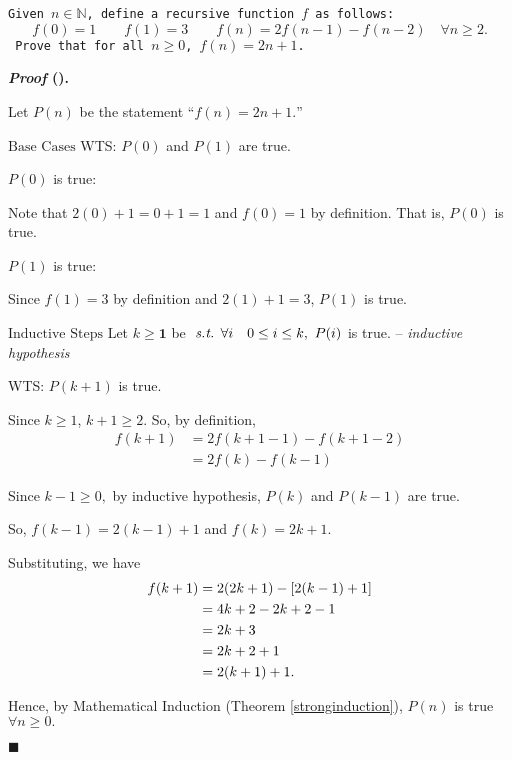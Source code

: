 \documentclass[12pt,a4paper]{article}
\newcounter{nprf}[subsection]
\newenvironment*{prf}{\par\indent\textbf{\textit{Proof} (\stepcounter{nprf}\thenprf). }\par }{\par\hfill $\blacksquare$\par}
\def\N{{\mathbb{N}}}
\def\st{\emph{ s.t. }}
\begin{document}
\begin{framed}
\noindent\texttt{Given $n\in\N$, define a recursive function $f$ as follows: \[f(0)=1\qquad f(1)=3\qquad f(n)=2f(n-1)-f(n-2)\quad\forall n\geq2.\] Prove that for all $n\geq0$, $f(n)=2n+1$.}
\begin{prf}
	Let $P(n)$ be the statement ``$f(n)=2n+1.$''\par$\boxed{\text{Base Cases}}$ 	WTS: $P(0)$ and $P(1)$ are true.\par\hspace{5mm} $P(0)$ is true: \big[WTS: $f(0)=2(0)+1$\big]\par\hspace{10mm}Note that $2(0)+1=0+1=1$ and $f(0)=1$ by definition. That is, $P(0)$ is true.\par\hspace{5mm} $P(1)$ is true: \big[WTS:$f(1)=2(1)+1$\big]\par\hspace{10mm} Since $f(1)=3$ by definition and $2(1)+1=3$, $P(1)$ is true. \par$\boxed{\text{Inductive Steps}}$ Let $k\geq\mathbf{1}$ be $\st\forall i\quad 0\leq i\leq k,\ P(i)$ is true. -- \textit{inductive hypothesis} \par\hspace{5mm} WTS: $P(k+1)$ is true. \par\hspace{5mm} Since $k\geq1$, $k+1\geq2$. So, by definition, \[\begin{aligned}f(k+1)&=2f(k+1-1)-f(k+1-2)\\&=2f(k)-f(k-1)\end{aligned}\]\par\hspace{5mm} Since $k-1\geq0,$ by inductive hypothesis, $P(k)$ and $P(k-1)$ are true.\par\hspace{5mm} So, $f(k-1)=2(k-1)+1$ and $f(k)=2k+1$.\par\hspace{5mm} Substituting, we have \[\begin{aligned}f(k+1)&=2(2k+1)-\qty[2(k-1)+1]\\&=4k+2-2k+2-1\\&=2k+3\\&=2k+2+1\\&=2(k+1)+1.\end{aligned}\]\par Hence, by Mathematical Induction (Theorem \ref{stronginduction}), $P(n)$ is true $\forall n\geq0.$
	\end{prf}
\end{framed}
\end{document}
